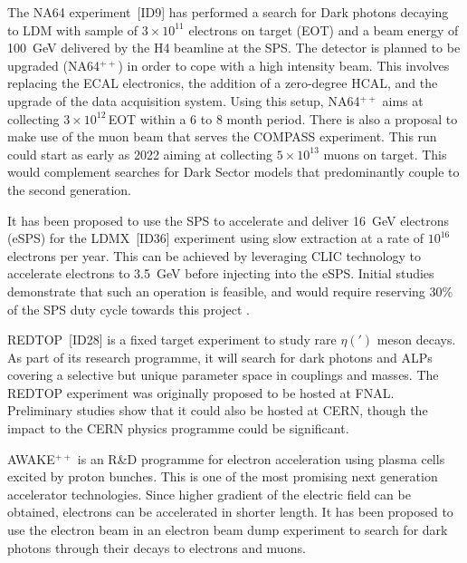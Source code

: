 \documentclass[../report.tex]{subfiles}
\begin{document}
The NA64 experiment~[ID9] has performed a search for Dark photons decaying to LDM with sample of $3\times10^{11}$ electrons on target (EOT) and a beam energy of 100~GeV delivered by the H4 beamline at the SPS. The detector is planned to be upgraded (NA64$^{++}$) in order to cope with a high intensity beam. This involves replacing the ECAL electronics, the addition of a zero-degree HCAL, and the upgrade of the data acquisition system. Using this setup, NA64$^{++}$ aims at collecting $3\times10^{12}$\,EOT within a 6 to 8 month period. There is also a proposal to make use of the muon beam that serves the COMPASS experiment. This run could start as early as 2022 aiming at collecting $5\times10^{13}$ muons on target. This would complement searches for Dark Sector models that predominantly couple to the second generation. %

It has been proposed to use the SPS to accelerate and deliver 16~GeV electrons (eSPS) for the LDMX~[ID36] experiment using slow extraction at a rate of $10^{16}$ electrons per year. This can be achieved by leveraging CLIC technology to  accelerate electrons to 3.5~GeV before injecting into the eSPS. Initial studies demonstrate that such an operation is feasible, and would require reserving 30\% of the SPS duty cycle towards this project \cite{Akesson:2018yrp}.

REDTOP~[ID28] is a fixed target experiment to study rare $\eta(')$ meson decays. As part of its research programme, it will search for dark photons and ALPs covering a selective but unique parameter space in  couplings and masses. The REDTOP experiment was originally proposed to be hosted at FNAL. Preliminary studies show that it could also be hosted at CERN, though the impact to the CERN physics programme could be significant.

AWAKE$^{++}$ is an R\&D programme for electron acceleration using plasma cells excited by proton bunches. This is one of the most promising next generation accelerator technologies. Since higher gradient of the electric field can be obtained, electrons can be accelerated in shorter length. It has been proposed to use the electron beam in an electron beam dump experiment to search for dark photons through their decays to electrons and muons.
\end{document}
